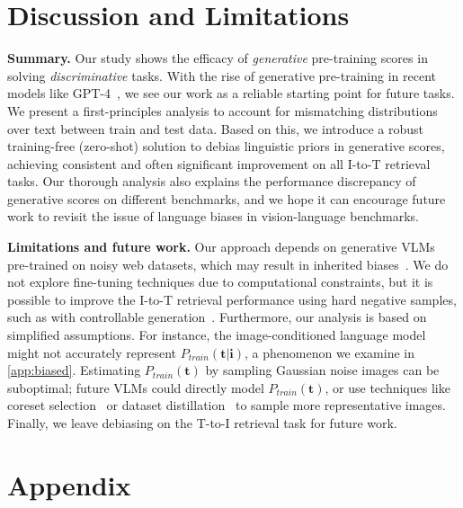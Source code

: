 \documentclass{article} \usepackage{iclr2024_conference,times}
\begin{document}
\section{Discussion and Limitations}
{\bf Summary.} Our study shows the efficacy of {\em generative} pre-training scores in solving {\em discriminative} tasks. With the rise of generative pre-training in recent models like GPT-4~\citep{gpt4}, we see our work as a reliable starting point for future tasks. We present a first-principles analysis to account for mismatching distributions over text between train and test data. Based on this, we introduce a robust training-free (zero-shot) solution to debias linguistic priors in generative scores, achieving consistent and often significant improvement on all I-to-T retrieval tasks. Our thorough analysis also explains the performance discrepancy of generative scores on different benchmarks, and we hope it can encourage future work to revisit the issue of language biases in vision-language benchmarks.

{\bf Limitations and future work.} Our approach depends on generative VLMs pre-trained on noisy web datasets, which may result in inherited biases~\citep{mehrabi2021survey}. We do not explore fine-tuning techniques due to computational constraints, but it is possible to improve the I-to-T retrieval performance using hard negative samples, such as with controllable generation~\citep{keskar2019ctrl}. Furthermore, our analysis is based on simplified assumptions. For instance, the image-conditioned language model might not accurately represent $P_{train}(\mathbf{t}|\mathbf{i})$, a phenomenon we examine in \autoref{app:biased}. Estimating  $P_{train}(\mathbf{t})$ by sampling Gaussian noise images can be suboptimal; future VLMs could directly model $P_{train}(\mathbf{t})$, or use techniques like coreset selection~\citep{guo2022deepcore} or dataset distillation~\citep{wu2023multimodal} to sample more representative images. Finally, we leave debiasing on the T-to-I retrieval task for future work.
















\clearpage
\appendix
\vspace{-0.1in}
\section*{\Large Appendix}
\end{document}

